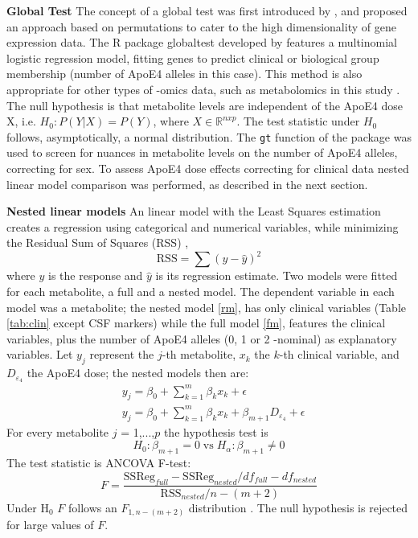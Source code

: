 \documentclass{amsart}
\begin{document}
\leavevmode\newline\textbf{Global Test}\hspace{.25cm} The concept of a global test was first introduced by \citeauthor{Simon2004DesignHealth}, and proposed an approach based on permutations to cater to the high dimensionality of gene expression data. The R package \textsf{globaltest} \cite{Goeman2004AOutcome, Goeman2006TestingAlternative, Goeman2023ThePackage} developed by \citeauthor{Goeman2004AOutcome} features a multinomial logistic regression model, fitting genes to predict clinical or biological group membership (number of ApoE4 alleles in this case). This method is also appropriate for other types of -omics data, such as metabolomics in this study \cite{Goeman2023ThePackage}. The null hypothesis is that metabolite levels are independent of the ApoE4 dose X, i.e. $H_0 : P(Y|X) = P(Y)$, where $X \in \mathbb{R}^{n x p}$. The test statistic under $H_0$ follows, asymptotically, a normal distribution. The \texttt{gt} function of the package was used to screen for nuances in metabolite levels on the number of ApoE4 alleles, correcting for sex. To assess ApoE4 dose effects correcting for clinical data nested linear model comparison was performed, as described in the next section.

\leavevmode\newline \textbf{Nested linear models}\hspace{.25cm}
An linear model with the Least Squares estimation creates a regression using categorical and numerical variables, while minimizing the Residual Sum of Squares (RSS) \cite{ott2015introduction}, 
$$\mathrm{RSS} = \sum (y - \hat{y})^2$$ where $y$ is the response and $\hat{y}$ is its regression estimate. Two models were fitted for each metabolite, a full and a nested model. The dependent variable in each model was a metabolite; the nested model \eqref{rm}, has only clinical variables (Table \ref{tab:clin} except CSF markers) while the full model \eqref{fm}, features the clinical variables, plus the number of ApoE4 alleles (0, 1 or 2 -nominal) as explanatory variables. Let $y_j$ represent the $j$-th metabolite, $x_k$ the $k$-th clinical variable, and $D_{\varepsilon_4}$ the ApoE4 dose; the nested models then are:
\begin{align}
    & y_j = \beta_0 + \sum_{k=1}^m\beta_kx_k +\epsilon \label{rm} \\
    & y_j = \beta_0 + \sum_{k=1}^m\beta_kx_k + \beta_{m+1}D_{\varepsilon_4} + \epsilon \label{fm}
\end{align}
For every metabolite $j$ = 1,...,$p$ the hypothesis test is 
\[H_0: \beta_{m+1} = 0 \; \mathrm{vs} \; H_\alpha: \beta_{m+1} \neq 0\]
The test statistic is ANCOVA F-test:
\[ F = \frac{\mathrm{SSReg}_{full}-\mathrm{SSReg}_{nested}/df_{full}-df_{nested}}{\mathrm{RSS}_{nested}/n-(m+2)}\]
Under H$_0$ $F$ follows an $F_{1, n-(m+2)}$ distribution \cite{ott2015introduction}. The null hypothesis is rejected for large values of $F$.
\end{document}
